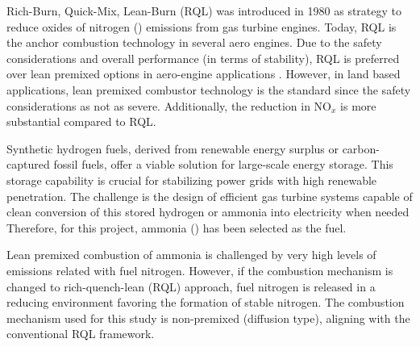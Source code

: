 Rich-Burn, Quick-Mix, Lean-Burn (RQL) was introduced in 1980 as strategy to reduce oxides of nitrogen () emissions from gas turbine engines. Today, RQL is the anchor combustion technology in several aero engines. Due to the safety considerations and overall performance (in terms of stability), RQL is preferred over lean premixed options in aero-engine applications \cite{samuelsen2006rich}. However, in land based applications, lean premixed combustor technology is the standard since the safety considerations as not as severe. Additionally, the reduction in NO$_x$ is more substantial compared to RQL.\par \vspace{10pt}

Synthetic hydrogen fuels, derived from renewable energy surplus or carbon-captured fossil fuels, offer a viable solution for large-scale energy storage. This storage capability is crucial for stabilizing power grids with high renewable penetration. The challenge is the design of efficient gas turbine systems capable of clean conversion of this stored hydrogen or ammonia into electricity when needed \cite{Lefebvre2010, dreizler2021role} Therefore, for this project, ammonia () has been selected as the fuel.\par \vspace{10pt}

Lean premixed combustion of ammonia is challenged by very high levels of  emissions related with fuel nitrogen. However, if the combustion mechanism is changed to rich-quench-lean (RQL) approach, fuel nitrogen is released in a reducing environment favoring the formation of stable nitrogen.  The combustion mechanism used for this study is non-premixed (diffusion type), aligning with the conventional RQL framework.


%    


